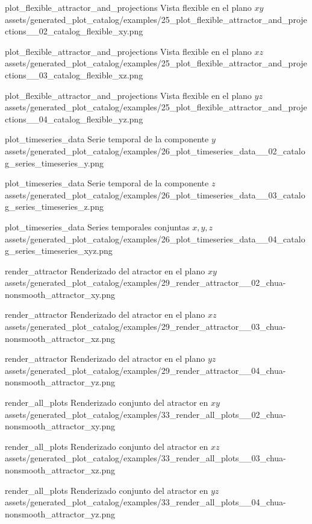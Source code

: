 \plotcatalogextra
  {plot_flexible_attractor_and_projections}
  {Vista flexible en el plano \(xy\)}
  {assets/generated_plot_catalog/examples/25_plot_flexible_attractor_and_projections__02_catalog_flexible_xy.png}

\plotcatalogextra
  {plot_flexible_attractor_and_projections}
  {Vista flexible en el plano \(xz\)}
  {assets/generated_plot_catalog/examples/25_plot_flexible_attractor_and_projections__03_catalog_flexible_xz.png}

\plotcatalogextra
  {plot_flexible_attractor_and_projections}
  {Vista flexible en el plano \(yz\)}
  {assets/generated_plot_catalog/examples/25_plot_flexible_attractor_and_projections__04_catalog_flexible_yz.png}

\plotcatalogextra
  {plot_timeseries_data}
  {Serie temporal de la componente \(y\)}
  {assets/generated_plot_catalog/examples/26_plot_timeseries_data__02_catalog_series_timeseries_y.png}

\plotcatalogextra
  {plot_timeseries_data}
  {Serie temporal de la componente \(z\)}
  {assets/generated_plot_catalog/examples/26_plot_timeseries_data__03_catalog_series_timeseries_z.png}

\plotcatalogextra
  {plot_timeseries_data}
  {Series temporales conjuntas \(x,y,z\)}
  {assets/generated_plot_catalog/examples/26_plot_timeseries_data__04_catalog_series_timeseries_xyz.png}

\plotcatalogextra
  {render_attractor}
  {Renderizado del atractor en el plano \(xy\)}
  {assets/generated_plot_catalog/examples/29_render_attractor__02_chua-nonsmooth_attractor_xy.png}

\plotcatalogextra
  {render_attractor}
  {Renderizado del atractor en el plano \(xz\)}
  {assets/generated_plot_catalog/examples/29_render_attractor__03_chua-nonsmooth_attractor_xz.png}

\plotcatalogextra
  {render_attractor}
  {Renderizado del atractor en el plano \(yz\)}
  {assets/generated_plot_catalog/examples/29_render_attractor__04_chua-nonsmooth_attractor_yz.png}

\plotcatalogextra
  {render_all_plots}
  {Renderizado conjunto del atractor en \(xy\)}
  {assets/generated_plot_catalog/examples/33_render_all_plots__02_chua-nonsmooth_attractor_xy.png}

\plotcatalogextra
  {render_all_plots}
  {Renderizado conjunto del atractor en \(xz\)}
  {assets/generated_plot_catalog/examples/33_render_all_plots__03_chua-nonsmooth_attractor_xz.png}

\plotcatalogextra
  {render_all_plots}
  {Renderizado conjunto del atractor en \(yz\)}
  {assets/generated_plot_catalog/examples/33_render_all_plots__04_chua-nonsmooth_attractor_yz.png}

